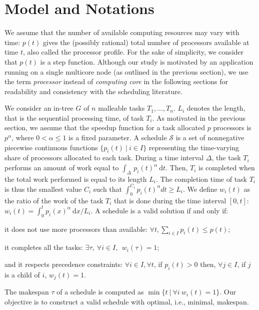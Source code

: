 \documentclass{llncs}
\newcommand{\inte}[4][]{\int_{#2}^{#1} \! #3 \ \mathrm #4}
\newcommand{\s}{\mathcal S\xspace}
\newcommand{\T}{\Delta}
\newcommand{\tl}{\tau}
\newcommand{\fctofproc}{{processor profile}\xspace}
\begin{document}
\section{Model and Notations}
\label{sec:model}

We assume that the number of available computing resources may vary
with time: $p(t)$ gives the (possibly rational) total number of processors
available at time $t$, also called the \fctofproc. For the sake of
simplicity, we consider that $p(t)$ is a step function. Although our
study is motivated by an application running on a single multicore
node (as outlined in the previous section), we use the term
\emph{processor} instead of \emph{computing core} in the following
sections for readability and consistency with the scheduling
literature.

We consider an in-tree $G$ of $n$ malleable tasks $T_1, \ldots, T_n$.
$L_i$ denotes the length, that is the sequential processing time, of
task $T_i$.  As motivated in the previous section, we assume that the
speedup function for a task allocated $p$ processors is $p^\alpha$,
where $0 < \alpha \leq 1$ is a fixed parameter.
A schedule $\s$ is a set of nonnegative piecewise continuous functions
$\big\{ p_i(t)\ \big|\ i\in I\big\}$ representing the time-varying
share of processors allocated to each task. During a time interval
$\T$, the task $T_i$ performs an amount of work equal to $ \inte{\T\
}{p_i(t)^\alpha}{dt}$. Then, $T_i$ is completed when the total work
performed is equal to its length $L_i$. The completion time of task
$T_i$ is thus the smallest value $C_i$ such that $
\int_0^{C_i}{p_i(t)^\alpha}{dt} \geq L_i$.
We define $w_i(t)$ as the ratio of the
work of the task $T_i$ that is done during the time interval $[0,t]$:
$w_i(t) = \inte[t]{0}{p_i(x)^\alpha}{dx} \big/ L_i $.  A schedule is a
valid solution if and only if:
\begin{compactitem}
\item it does not use more processors than available: $\forall t,  \sum_{i\in I} p_i(t) \leq p(t)$;
\item it completes all the tasks: $\exists\tl,\ \forall i \in I, \ \ w_i(\tl)=1$;
\item and it respects precedence constraints:
  $\forall i\in I, \forall t$, if $p_i(t)>0$ then, $\forall j \in I$,
  if $j$ is a child of $i$, $w_j(t)=1$.
\end{compactitem}
The makespan $\tl$ of a schedule is computed as $\min \{t \ | \
\forall i\ w_i(t) = 1\}$. Our objective is to construct a valid
schedule with optimal, i.e., minimal, makespan.
\end{document}

